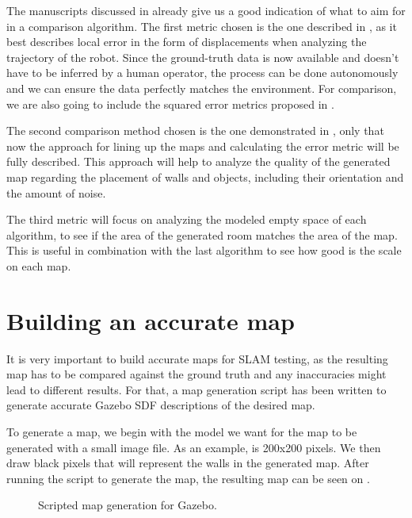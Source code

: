 The manuscripts discussed in  already give us a good indication of what to aim for in a comparison algorithm. The first metric chosen is the one described in \cite{kummerle2009measuring}, as it best describes local error in the form of displacements when analyzing the trajectory of the robot. Since the ground-truth data is now available and doesn't have to be inferred by a human operator, the process can be done autonomously and we can ensure the data perfectly matches the environment. For comparison, we are also going to include the squared error metrics proposed in .

The second comparison method chosen is the one demonstrated in \cite{santos2013evaluation}, only that now the approach for lining up the maps and calculating the error metric will be fully described. This approach will help to analyze the quality of the generated map regarding the placement of walls and objects, including their orientation and the amount of noise.

The third metric will focus on analyzing the modeled empty space of each algorithm, to see if the area of the generated room matches the area of the map. This is useful in combination with the last algorithm to see how good is the scale on each map.

\section{Building an accurate map}

It is very important to build accurate maps for SLAM testing, as the resulting map has to be compared against the ground truth and any inaccuracies might lead to different results. For that, a map generation script has been written to generate accurate Gazebo SDF descriptions of the desired map.

To generate a map, we begin with the model we want for the map to be generated with a small image file. As an example,  is 200x200 pixels. We then draw black pixels that will represent the walls in the generated map. After running the script to generate the map, the resulting map can be seen on .

\begin{figure}[!ht]
     \centering
     \hfill
     \caption{Scripted map generation for Gazebo.}
     \label{fig:map_generation_script}
\end{figure}

